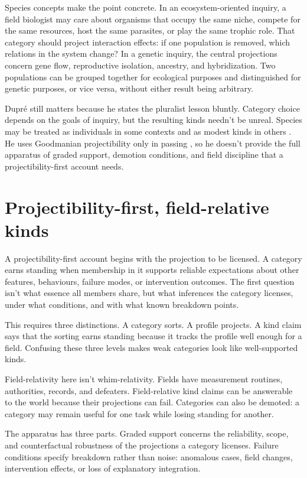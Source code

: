 \documentclass[12pt]{article}
\begin{document}
Species concepts make the point concrete. In an ecosystem-oriented inquiry, a field biologist may care about organisms that occupy the same niche, compete for the same resources, host the same parasites, or play the same trophic role. That category should project interaction effects: if one population is removed, which relations in the system change? In a genetic inquiry, the central projections concern gene flow, reproductive isolation, ancestry, and hybridization. Two populations can be grouped together for ecological purposes and distinguished for genetic purposes, or vice versa, without either result being arbitrary.

Dupré still matters because he states the pluralist lesson bluntly. Category choice depends on the goals of inquiry, but the resulting kinds needn't be unreal. Species may be treated as individuals in some contexts and as modest kinds in others \citep[235]{dupre1993disorder}. He uses Goodmanian projectibility only in passing \citep[279 n.~20]{dupre1993disorder}, so he doesn't provide the full apparatus of graded support, demotion conditions, and field discipline that a projectibility-first account needs.

\section{Projectibility-first, field-relative kinds}

A projectibility-first account begins with the projection to be licensed. A category earns standing when membership in it supports reliable expectations about other features, behaviours, failure modes, or intervention outcomes. The first question isn't what essence all members share, but what inferences the category licenses, under what conditions, and with what known breakdown points.

This requires three distinctions. A category sorts. A profile projects. A kind claim says that the sorting earns standing because it tracks the profile well enough for a field. Confusing these three levels makes weak categories look like well-supported kinds.

Field-relativity here isn't whim-relativity. Fields have measurement routines, authorities, records, and defeaters. Field-relative kind claims can be answerable to the world because their projections can fail. Categories can also be demoted: a category may remain useful for one task while losing standing for another.

The apparatus has three parts. Graded support concerns the reliability, scope, and counterfactual robustness of the projections a category licenses. Failure conditions specify breakdown rather than noise: anomalous cases, field changes, intervention effects, or loss of explanatory integration.
\end{document}
